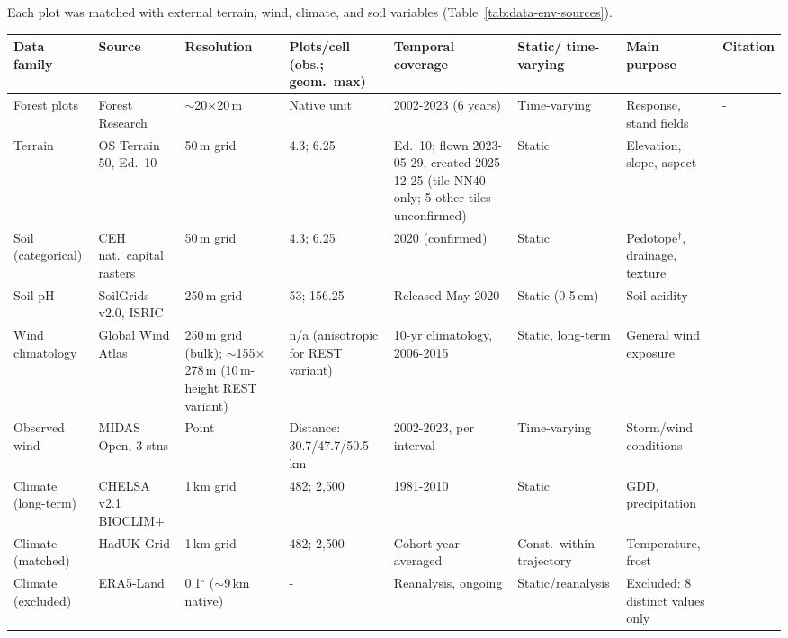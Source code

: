 Each plot was matched with external terrain, wind, climate, and soil variables (Table~\ref{tab:data-env-sources}). 

\begin{table}[!htbp]
\tiny
\setlength{\tabcolsep}{2pt}
\renewcommand{\arraystretch}{0.9}
\begin{tabular}{p{1.6cm}p{2.1cm}p{1.6cm}p{1.5cm}p{2.3cm}p{1.6cm}p{2.3cm}p{0.7cm}}
\hline
Data family & Source & Resolution & Plots/cell (obs.; geom.\ max) & Temporal coverage & Static/ time-varying & Main purpose & Citation \\
\hline
Forest plots & Forest Research & $\sim$20$\times$20\,m & Native unit & 2002-2023 (6 years) & Time-varying & Response, stand fields & - \\
Terrain & OS Terrain 50, Ed.\ 10 & 50\,m grid & 4.3; 6.25 & Ed.\ 10; flown 2023-05-29, created 2025-12-25 (tile NN40 only; 5 other tiles unconfirmed) & Static & Elevation, slope, aspect & \cite{ordnancesurveyTerrain50_C3_LID} \\
Soil (categorical) & CEH nat.\ capital rasters & 50\,m grid & 4.3; 6.25 & 2020 (confirmed) & Static & Pedotope$^{\dagger}$, drainage, texture & \cite{feeney2026CEHNaturalCapital_C3_LID} \\
Soil pH & SoilGrids v2.0, ISRIC & 250\,m grid & 53; 156.25 & Released May 2020 & Static (0-5\,cm) & Soil acidity & \cite{poggio2021SoilGrids_C3_LID} \\
Wind climatology & Global Wind Atlas & 250\,m grid (bulk); $\sim$155$\times$278\,m (10\,m-height REST variant) & n/a (anisotropic for REST variant) & 10-yr climatology, 2006-2015 & Static, long-term & General wind exposure & \cite{davis2023GlobalWindAtlas_C3_LID} \\
Observed wind & MIDAS Open, 3 stns & Point & Distance: 30.7/47.7/50.5\,km & 2002-2023, per interval & Time-varying & Storm/wind conditions & \cite{metoffice2019MIDASOpen_C3_LID} \\
Climate (long-term) & CHELSA v2.1 BIOCLIM+ & 1\,km grid & 482; 2{,}500 & 1981-2010 & Static & GDD, precipitation & \cite{karger2017CHELSA_C3_LID} \\
Climate (matched) & HadUK-Grid & 1\,km grid & 482; 2{,}500 & Cohort-year-averaged & Const.\ within trajectory & Temperature, frost & \cite{hollis2019HadUKGrid_C3_LID} \\
Climate (excluded) & ERA5-Land & 0.1$^\circ$ ($\sim$9\,km native) & - & Reanalysis, ongoing & Static/reanalysis & Excluded: 8 distinct values only & \cite{munozsabater2021ERA5Land_C3_LID} \\

\end{tabular}
\end{table}
